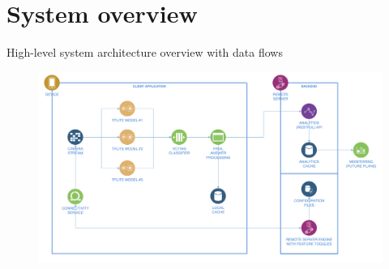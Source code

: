 \documentclass{beamer}%
\begin{document}
\section[System overview]{System overview}
\begin{frame}{High-level system architecture overview with data flows}
\begin{changemargin}
\footnotesize

\begin{figure}[h]
\begin{minipage}[h]{\linewidth}
\hbox{\hspace{-0.8em}\includegraphics[width=1.08\linewidth]{img/system_overview}}
\end{minipage}
\end{figure}



\end{changemargin}
\end{frame}
\end{document}
